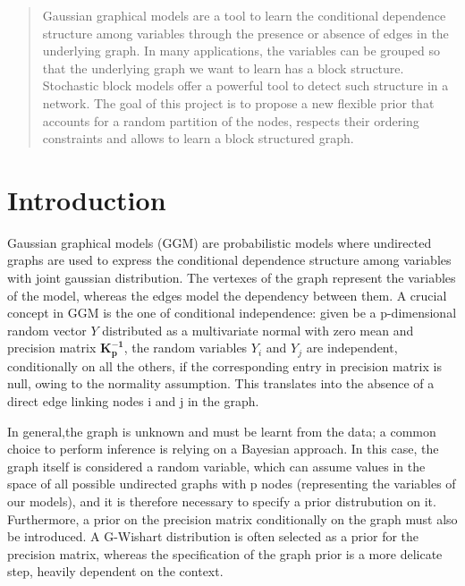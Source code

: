 


\begin{abstract} %
Gaussian graphical models are a tool to learn the conditional dependence structure among variables through the presence or absence of edges in the underlying graph. In many applications, the variables can be grouped so that the underlying graph we want to learn has a block structure. Stochastic block models offer a powerful tool to detect such structure in a network. The goal of this project is to propose a new flexible prior that accounts for a random partition of the nodes, respects their ordering constraints and allows to learn a block structured graph.
\end{abstract}


\section{Introduction}

Gaussian graphical models (GGM) are probabilistic models where undirected graphs are used to express the conditional dependence structure among variables with joint gaussian distribution. The vertexes of the graph represent the variables of the model, whereas the edges model the dependency between them. A crucial concept in GGM is the one of conditional independence: given be a p-dimensional random vector $Y$ distributed as a multivariate normal with zero mean and precision matrix $\mathbf{K_{p}^{-1}}$, the random variables $Y_i$ and $Y_j$ are independent, conditionally on all the others, if the corresponding entry in precision matrix  is null, owing to the normality assumption. This translates into the absence of a direct edge linking nodes i and j in the graph. 

In general,the graph is unknown and must be learnt from the data; a common choice to perform inference is relying on a Bayesian approach. In this case, the graph itself is considered a random variable, which can assume values in the space of all possible undirected graphs with p nodes (representing the variables of our models), and it is therefore necessary to specify a prior distrubution on it. Furthermore, a prior on the precision matrix conditionally on the graph must also be introduced. A G-Wishart distribution is often selected as a prior for the precision matrix, whereas the specification of the graph prior is a more delicate step, heavily dependent on the context.

